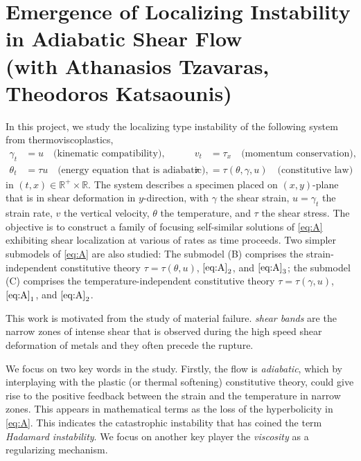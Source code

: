 \documentclass[a4paper,11pt]{article}
\begin{document}
\vspace{-2em}
\section{Emergence of Localizing Instability in Adiabatic Shear Flow \\{\small(with Athanasios Tzavaras, Theodoros Katsaounis)}}
In this project, we study the {localizing} type instability of the following system from thermoviscoplastics,
\begin{equation} \label{eq:A}\tag{A}
\begin{aligned}
 \gamma_t &= u \quad \text{(kinematic compatibility)}, 	&
 v_t &= \tau_x \quad \text{(momentum conservation)}, 	\\
 \theta_t &= \tau u \quad \text{(energy equation that is adiabatic)},	&
 \tau &=\tau(\theta,\gamma,u) \quad \text{(constitutive law)}			
\end{aligned}
\end{equation}
in $(t,x)\in \mathbb{R}^+\times \mathbb{R}$. The system describes a specimen placed on $(x,y)$-plane that is in shear deformation in $y$-direction, with $\gamma$ the shear strain, $u=\gamma_t$ the strain rate, $v$ the vertical velocity, $\theta$ the temperature, and $\tau$ the shear stress. The objective is to construct a family of focusing self-similar solutions of \eqref{eq:A} exhibiting shear localization at various of rates as time proceeds. Two simpler submodels of \eqref{eq:A} are also studied: The submodel (B) comprises the strain-independent constitutive theory $\tau = \tau(\theta,u)$, $\eqref{eq:A}_2$, and $\eqref{eq:A}_3$; the submodel (C) comprises the temperature-independent constitutive theory $\tau = \tau(\gamma,u)$, $\eqref{eq:A}_1$, and $\eqref{eq:A}_2$.

This work is motivated from the study of material failure. {\it shear bands} are the narrow zones of intense shear that is observed during the high speed shear deformation of metals and they often precede the rupture.

We focus on two key words in the study. Firstly, the flow is {\it adiabatic}, which by interplaying with the {plastic (or thermal softening)} constitutive theory, could give rise to the positive feedback between the strain and the temperature in narrow zones. This appears in mathematical terms as the loss of the hyperbolicity in \eqref{eq:A}. This indicates the catastrophic instability that has coined the term {\it Hadamard instability}. We focus on another key player the {\it viscosity} as a regularizing mechanism. %
\end{document}
